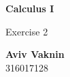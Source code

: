 \documentclass[a4paper, 12pt]{article}
\begin{document}
    \begin{center}
        \vspace*{4.4cm}
            
        \Huge
        \textbf{Calculus I}
            
        \vspace{0.5cm}
        \LARGE
        Exercise 2

        \vfill
            
        \Large
        \textbf{Aviv Vaknin}\\316017128
                    
    \end{center}
\end{document}
